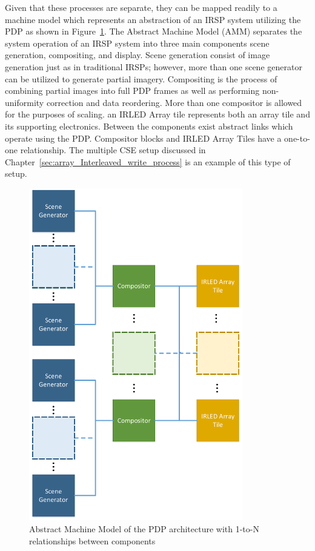     Given that these processes are separate, they can be mapped readily to a machine model which represents an abstraction of an IRSP system utilizing the PDP as shown in Figure~\ref{fig:amm}. The Abstract Machine Model (AMM) separates the system operation of an IRSP system into three main components scene generation, compositing, and display. Scene generation consist of image generation just as in traditional IRSPs; however, more than one scene generator can be utilized to generate partial imagery. Compositing is the process of combining partial images into full PDP frames as well as performing non-uniformity correction and data reordering. More than one compositor is allowed for the purposes of scaling. an IRLED Array tile represents both an array tile and its supporting electronics. Between the components exist abstract links which operate using the PDP. Compositor blocks and IRLED Array Tiles have a one-to-one relationship. The multiple CSE setup discussed in Chapter~\ref{sec:array_Interleaved_write_process} is an example of this type of setup.

    \begin{figure}
        \centering
        \includegraphics[width=0.83\textwidth]{fig/amm.pdf}
        \caption{Abstract Machine Model of the PDP architecture with 1-to-N relationships between components}
        \label{fig:amm}
    \end{figure}

